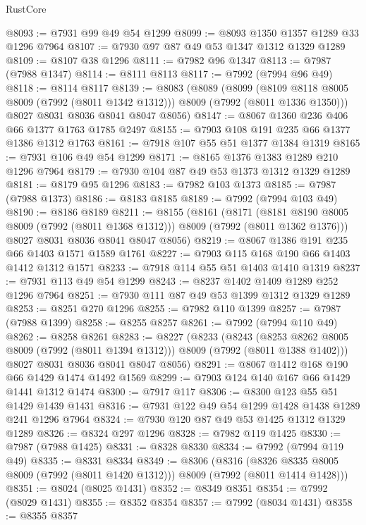 \begin{lexlean}{RustCore}
\begin{coremodule}
@8093 := @7931 @99 @49 @54 @1299
@8099 := @8093 @1350 @1357 @1289 @33 @1296 @7964
@8107 := @7930 @97 @87 @49 @53 @1347 @1312 @1329 @1289
@8109 := @8107 @38 @1296
@8111 := @7982 @96 @1347
@8113 := @7987 (@7988 @1347)
@8114 := @8111 @8113
@8117 := @7992 (@7994 @96 @49)
@8118 := @8114 @8117
@8139 := @8083
    (@8089
      (@8099
        (@8109 @8118 @8005 @8009 (@7992 (@8011 @1342 @1312)))
        @8009
        (@7992 (@8011 @1336 @1350)))
      @8027
      @8031
      @8036
      @8041
      @8047
      @8056)
@8147 := @8067 @1360 @236 @406 @66 @1377 @1763 @1785 @2497
@8155 := @7903 @108 @191 @235 @66 @1377 @1386 @1312 @1763
@8161 := @7918 @107 @55 @51 @1377 @1384 @1319
@8165 := @7931 @106 @49 @54 @1299
@8171 := @8165 @1376 @1383 @1289 @210 @1296 @7964
@8179 := @7930 @104 @87 @49 @53 @1373 @1312 @1329 @1289
@8181 := @8179 @95 @1296
@8183 := @7982 @103 @1373
@8185 := @7987 (@7988 @1373)
@8186 := @8183 @8185
@8189 := @7992 (@7994 @103 @49)
@8190 := @8186 @8189
@8211 := @8155
    (@8161
      (@8171
        (@8181 @8190 @8005 @8009 (@7992 (@8011 @1368 @1312)))
        @8009
        (@7992 (@8011 @1362 @1376)))
      @8027
      @8031
      @8036
      @8041
      @8047
      @8056)
@8219 := @8067 @1386 @191 @235 @66 @1403 @1571 @1589 @1761
@8227 := @7903 @115 @168 @190 @66 @1403 @1412 @1312 @1571
@8233 := @7918 @114 @55 @51 @1403 @1410 @1319
@8237 := @7931 @113 @49 @54 @1299
@8243 := @8237 @1402 @1409 @1289 @252 @1296 @7964
@8251 := @7930 @111 @87 @49 @53 @1399 @1312 @1329 @1289
@8253 := @8251 @270 @1296
@8255 := @7982 @110 @1399
@8257 := @7987 (@7988 @1399)
@8258 := @8255 @8257
@8261 := @7992 (@7994 @110 @49)
@8262 := @8258 @8261
@8283 := @8227
    (@8233
      (@8243
        (@8253 @8262 @8005 @8009 (@7992 (@8011 @1394 @1312)))
        @8009
        (@7992 (@8011 @1388 @1402)))
      @8027
      @8031
      @8036
      @8041
      @8047
      @8056)
@8291 := @8067 @1412 @168 @190 @66 @1429 @1474 @1492 @1569
@8299 := @7903 @124 @140 @167 @66 @1429 @1441 @1312 @1474
@8300 := @7917 @117
@8306 := @8300 @123 @55 @51 @1429 @1439 @1431
@8316 := @7931 @122 @49 @54 @1299 @1428 @1438 @1289 @241 @1296 @7964
@8324 := @7930 @120 @87 @49 @53 @1425 @1312 @1329 @1289
@8326 := @8324 @297 @1296
@8328 := @7982 @119 @1425
@8330 := @7987 (@7988 @1425)
@8331 := @8328 @8330
@8334 := @7992 (@7994 @119 @49)
@8335 := @8331 @8334
@8349 := @8306
    (@8316 (@8326 @8335 @8005 @8009 (@7992 (@8011 @1420 @1312))) @8009 (@7992 (@8011 @1414 @1428)))
@8351 := @8024 (@8025 @1431)
@8352 := @8349 @8351
@8354 := @7992 (@8029 @1431)
@8355 := @8352 @8354
@8357 := @7992 (@8034 @1431)
@8358 := @8355 @8357

\end{coremodule}
\end{lexlean}

